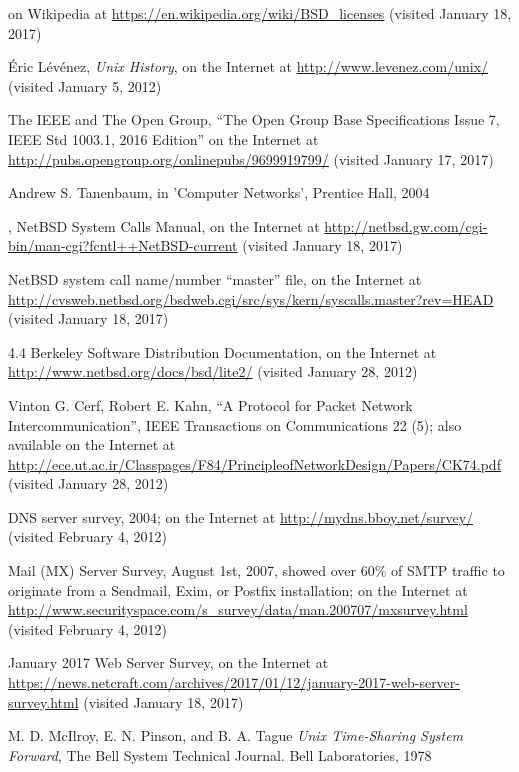 \begin{thebibliography}{99}
 on
Wikipedia at
\url{https://en.wikipedia.org/wiki/BSD\_licenses} (visited
January 18, 2017)

\'{E}ric L\'{e}v\'{e}nez, {\em Unix History}, on
the Internet at
\url{http://www.levenez.com/unix/} (visited January 5,
2012)

The IEEE and The Open Group, ``The Open Group Base
Specifications Issue 7, IEEE Std 1003.1, 2016 Edition'' on the Internet at
\url{http://pubs.opengroup.org/onlinepubs/9699919799/} (visited January 17,
2017)

Andrew S. Tanenbaum, in 'Computer Networks',
Prentice Hall, 2004

, NetBSD
System Calls Manual, on the Internet at
\url{http://netbsd.gw.com/cgi-bin/man-cgi?fcntl++NetBSD-current}
(visited January 18, 2017)

NetBSD system call name/number ``master'' file, on
the Internet at
\url{http://cvsweb.netbsd.org/bsdweb.cgi/src/sys/kern/syscalls.master?rev=HEAD}
(visited January 18, 2017)

4.4 Berkeley Software Distribution Documentation, on
the Internet at
\url{http://www.netbsd.org/docs/bsd/lite2/} (visited
January 28, 2012)

Vinton G. Cerf, Robert E. Kahn, ``A Protocol for
Packet Network Intercommunication'', IEEE Transactions on Communications 22 (5);
also available on the Internet at
\url{http://ece.ut.ac.ir/Classpages/F84/PrincipleofNetworkDesign/Papers/CK74.pdf}
(visited January 28, 2012)

DNS server survey, 2004; on the Internet at
\url{http://mydns.bboy.net/survey/} (visited February 4, 2012)

Mail (MX) Server Survey, August 1st, 2007, showed over
60\% of SMTP traffic to originate from a Sendmail, Exim, or Postfix
installation; on the Internet at
\url{http://www.securityspace.com/s\_survey/data/man.200707/mxsurvey.html}
(visited February 4, 2012)

January 2017 Web Server Survey, on the Internet at
\url{https://news.netcraft.com/archives/2017/01/12/january-2017-web-server-survey.html}
(visited January 18, 2017)

M. D. McIlroy, E. N. Pinson, and B. A.
Tague {\em Unix Time-Sharing System Forward}, The Bell System Technical
Journal. Bell Laboratories, 1978


\end{thebibliography}
